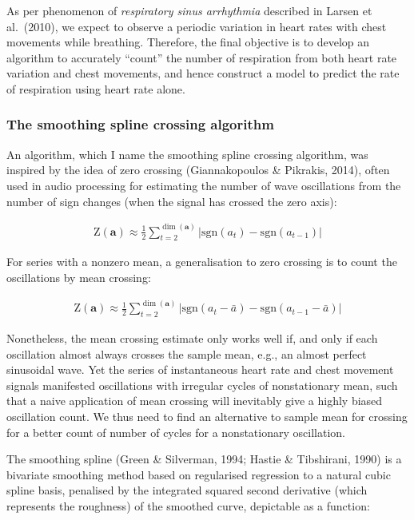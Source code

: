 \documentclass[
]{article}
\begin{document}
As per phenomenon of \emph{respiratory sinus arrhythmia} described in
Larsen et al.~(2010), we expect to observe a periodic variation in heart
rates with chest movements while breathing. Therefore, the final
objective is to develop an algorithm to accurately ``count'' the number
of respiration from both heart rate variation and chest movements, and
hence construct a model to predict the rate of respiration using heart
rate alone.

\hypertarget{the-smoothing-spline-crossing-algorithm}{%
\subsubsection{The smoothing spline crossing
algorithm}\label{the-smoothing-spline-crossing-algorithm}}

An algorithm, which I name the smoothing spline crossing algorithm, was
inspired by the idea of zero crossing (Giannakopoulos \& Pikrakis,
2014), often used in audio processing for estimating the number of wave
oscillations from the number of sign changes (when the signal has
crossed the zero axis):

\begin{align*}
  \text{Z}(\mathbf{a}) \approx \frac{1}{2} \sum_{t = 2}^{\dim(\mathbf{a})} |\text{sgn}(a_t) - \text{sgn}(a_{t - 1})|
\end{align*}

For series with a nonzero mean, a generalisation to zero crossing is to
count the oscillations by mean crossing:

\begin{align*}
  \text{Z}(\mathbf{a}) \approx \frac{1}{2} \sum_{t = 2}^{\dim(\mathbf{a})} |\text{sgn}(a_t - \bar{a}) - \text{sgn}(a_{t - 1} - \bar{a})|
\end{align*}

Nonetheless, the mean crossing estimate only works well if, and only if
each oscillation almost always crosses the sample mean, e.g., an almost
perfect sinusoidal wave. Yet the series of instantaneous heart rate and
chest movement signals manifested oscillations with irregular cycles of
nonstationary mean, such that a naive application of mean crossing will
inevitably give a highly biased oscillation count. We thus need to find
an alternative to sample mean for crossing for a better count of number
of cycles for a nonstationary oscillation.

The smoothing spline (Green \& Silverman, 1994; Hastie \& Tibshirani,
1990) is a bivariate smoothing method based on regularised regression to
a natural cubic spline basis, penalised by the integrated squared second
derivative (which represents the roughness) of the smoothed curve,
depictable as a function:
\end{document}
